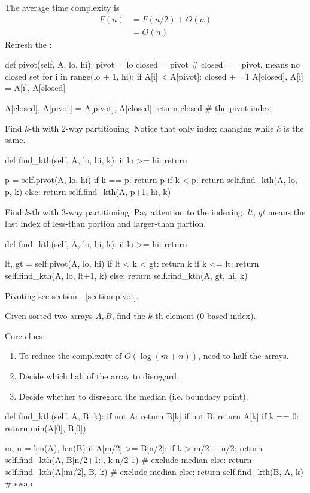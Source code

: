 The average time complexity is
\begin{align*}
F(n) &= F(n/2) + O(n) \\
&= O(n)
\end{align*}
Refresh the :
\begin{python}
def pivot(self, A, lo, hi):
    pivot = lo
    closed = pivot  # closed == pivot, means no closed set
    for i in range(lo + 1, hi):
        if A[i] < A[pivot]:
            closed += 1
            A[closed], A[i] = A[i], A[closed]

    A[closed], A[pivot] = A[pivot], A[closed]
    return closed  # the pivot index
\end{python}
Find $k$-th with 2-way partitioning. Notice that only index changing while $k$ is the same.
\begin{python}
def find_kth(self, A, lo, hi, k):
    if lo >= hi: return
    
    p = self.pivot(A, lo, hi)
    if k == p: return p
    if k < p:  return self.find_kth(A, lo, p, k)
    else:      return self.find_kth(A, p+1, hi, k)
\end{python}
Find $k$-th with 3-way partitioning. Pay attention to the indexing. $lt$, $gt$ means the last index of less-than portion and larger-than partion. 
\begin{python}
def find_kth(self, A, lo, hi, k):
    if lo >= hi: return

    lt, gt = self.pivot(A, lo, hi)
    if lt < k < gt: return k
    if k <= lt: return self.find_kth(A, lo, lt+1, k)
    else:       return self.find_kth(A, gt, hi, k)
\end{python}

Pivoting see section - \ref{section:pivot}.

 Given sorted two arrays $A, B$, find the $k$-th element (0 based index).

Core clues:
\begin{enumerate}
\item To reduce the complexity of $O(\log (m+n))$, need to half the arrays.
\item Decide which half of the array to disregard. 
\item Decide whether to disregard the median (i.e. boundary point).
\end{enumerate}
\begin{python}
def find_kth(self, A, B, k):
  if not A:  return B[k]
  if not B:  return A[k]
  if k == 0: return min(A[0], B[0])

  m, n = len(A), len(B)
  if A[m/2] >= B[n/2]:
    if k > m/2 + n/2:
      return self.find_kth(A, B[n/2+1:], k-n/2-1)  # exclude median
    else:
      return self.find_kth(A[:m/2], B, k)  # exclude median
  else:
    return self.find_kth(B, A, k)  # swap
\end{python}
